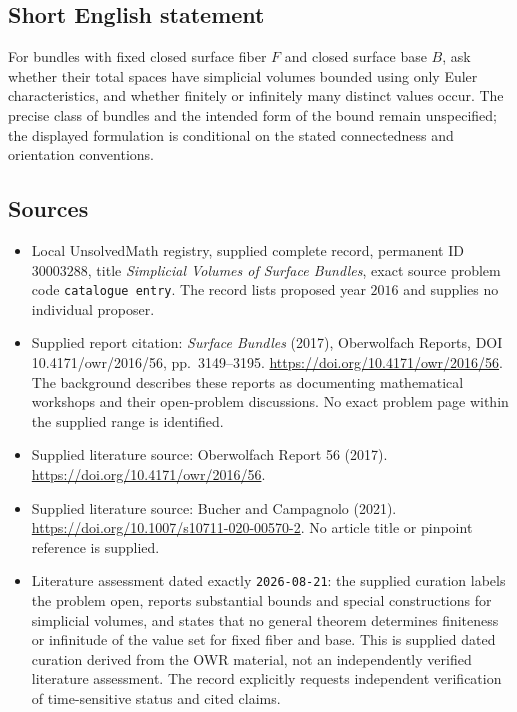 \documentclass[11pt]{article}
\begin{document}
\subsection{Short English statement}
For bundles with fixed closed surface fiber \(F\) and closed surface base \(B\), ask whether their total spaces have simplicial volumes bounded using only Euler characteristics, and whether finitely or infinitely many distinct values occur. The precise class of bundles and the intended form of the bound remain unspecified; the displayed formulation is conditional on the stated connectedness and orientation conventions.
\subsection{Sources}
\begin{itemize}
\item Local UnsolvedMath registry, supplied complete record, permanent ID \(30003288\), title \emph{Simplicial Volumes of Surface Bundles}, exact source problem code \texttt{catalogue entry}. The record lists proposed year \(2016\) and supplies no individual proposer.
\item Supplied report citation: \emph{Surface Bundles} (2017), Oberwolfach Reports, DOI 10.4171/owr/2016/56, pp.~3149--3195. \url{https://doi.org/10.4171/owr/2016/56}. The background describes these reports as documenting mathematical workshops and their open-problem discussions. No exact problem page within the supplied range is identified.
\item Supplied literature source: Oberwolfach Report 56 (2017). \url{https://doi.org/10.4171/owr/2016/56}.
\item Supplied literature source: Bucher and Campagnolo (2021). \url{https://doi.org/10.1007/s10711-020-00570-2}. No article title or pinpoint reference is supplied.
\item Literature assessment dated exactly \texttt{2026-08-21}: the supplied curation labels the problem open, reports substantial bounds and special constructions for simplicial volumes, and states that no general theorem determines finiteness or infinitude of the value set for fixed fiber and base. This is supplied dated curation derived from the OWR material, not an independently verified literature assessment. The record explicitly requests independent verification of time-sensitive status and cited claims.
\end{itemize}
\end{document}
